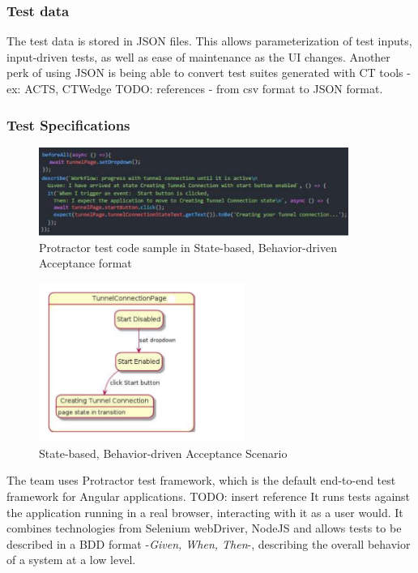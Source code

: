 \documentclass[conference]{IEEEtran}
\newcommand{\todo}[1]{}
\renewcommand{\todo}[1]{{\color{red} TODO: {#1}}}
\begin{document}
	\subsubsection{Test data}
	The test data is stored in JSON files. This allows parameterization of test inputs, input-driven tests, as well as ease of maintenance as the UI changes.
	Another perk of using JSON is being able to convert test suites generated with CT tools - ex: ACTS, CTWedge \todo{references }- from csv format to JSON format.

	\subsubsection{Test Specifications}

	\begin{figure}[!ht]
		\centering
			\includegraphics[width=0.90\textwidth]{codeSample.pdf}
		\caption{Protractor test code sample in State-based, Behavior-driven Acceptance format}
		\label{fig:codeSample}
	\end{figure}	


	\begin{figure}[!b]
		\includegraphics[width=0.60\textwidth,]{stateBasedScenario.pdf}
		\caption{State-based, Behavior-driven Acceptance Scenario}
		\label{fig:stateBasedScenario}
	\end{figure}

	The team uses Protractor test framework, which is the default end-to-end test framework for Angular applications. \todo{insert reference}
	It runs tests against the application running in a real browser, interacting with it as a user would.
	It combines technologies from Selenium webDriver, NodeJS and allows tests to be described in a BDD format -\textit{Given, When, Then}-, describing the overall behavior of a system at a low level.
	
\end{document}
